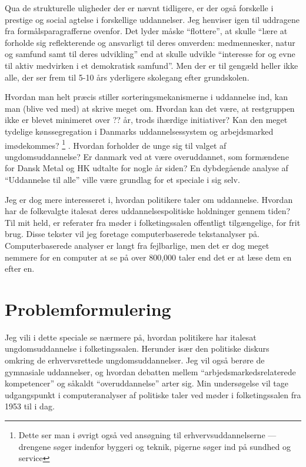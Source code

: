 Qua de strukturelle uligheder der er nævnt tidligere, er der også forskelle i prestige og social agtelse i forskellige uddannelser.
Jeg henviser igen til uddragene fra formålsparagrafferne ovenfor.
Det lyder måske “flottere”, at skulle “lære at forholde sig reflekterende og ansvarligt til deres omverden: medmennesker, natur og samfund samt til deres udvikling” end at skulle udvikle “interesse for og evne til aktiv medvirken i et demokratisk samfund”.
Men der er til gengæld heller ikke alle, der ser frem til 5-10 års yderligere skolegang efter grundskolen.


Hvordan man helt præcis stiller sorteringsmekanismerne i uddannelse ind, kan man (blive ved med) at skrive meget om.
Hvordan kan det være, at restgruppen ikke er blevet minimeret over ?? år, trods ihærdige initiativer?
Kan den meget tydelige kønssegregation i Danmarks uddannelsessystem og arbejdsmarked imødekommes?
\footnote{Dette ser man i øvrigt også ved ansøgning til erhvervsuddannelserne — drengene søger indenfor byggeri og teknik, pigerne søger ind på sundhed og service} .
Hvordan forholder de unge sig til valget af ungdomsuddannelse?
Er danmark ved at være overuddannet, som formændene for Dansk Metal og HK udtalte for nogle år siden? \autocite{simonsenLadOsGore2016}
En dybdegående analyse af “Uddannelse til alle” ville være grundlag for et speciale i sig selv.

Jeg er dog mere interesseret i, hvordan politikere taler om uddannelse.
Hvordan har de folkevalgte italesat deres uddannelsespolitiske holdninger gennem tiden?
Til mit held, er referater fra møder i folketingssalen offentligt tilgængelige, for frit brug.
Disse tekster vil jeg foretage computerbaserede tekstanalyser på.
Computerbaserede analyser er langt fra fejlbarlige, men det er dog meget nemmere for en computer at se på over 800,000 taler end det er at læse dem en efter en.

\chapter{Problemformulering}\label{chap:pf}
Jeg vili i dette speciale se nærmere på, hvordan politikere har italesat ungdomsuddannelse i folketingssalen.
Herunder især den politiske diskurs omkring de erhvervsrettede ungdomsuddannelser.
Jeg vil også berøre de gymnasiale uddannelser, og hvordan debatten mellem “arbjedsmarkedsrelaterede kompetencer” og såkaldt “overuddannelse” arter sig.
Min undersøgelse vil tage udgangspunkt i computeranalyser af politiske taler ved møder i folketingssalen fra 1953 til i dag.

